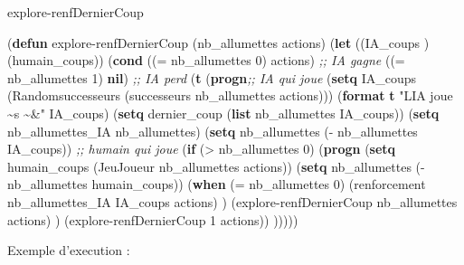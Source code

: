 \documentclass[
]{article}
\newenvironment{Shaded}{}{}
\newcommand{\CommentTok}[1]{\textcolor[rgb]{0.38,0.63,0.69}{\textit{#1}}}
\newcommand{\DecValTok}[1]{\textcolor[rgb]{0.25,0.63,0.44}{#1}}
\newcommand{\FunctionTok}[1]{\textcolor[rgb]{0.02,0.16,0.49}{#1}}
\newcommand{\KeywordTok}[1]{\textcolor[rgb]{0.00,0.44,0.13}{\textbf{#1}}}
\newcommand{\NormalTok}[1]{#1}
\newcommand{\OperatorTok}[1]{\textcolor[rgb]{0.40,0.40,0.40}{#1}}
\newcommand{\StringTok}[1]{\textcolor[rgb]{0.25,0.44,0.63}{#1}}
\begin{document}
\begin{Shaded}
\begin{algorithm}[H]
    \caption{explore-renfDernierCoup}
\begin{Highlighting}[]
\NormalTok{(}\KeywordTok{defun}\FunctionTok{ explore{-}renfDernierCoup }\NormalTok{(nb\_allumettes actions)}
\NormalTok{  (}\KeywordTok{let}\NormalTok{ ((IA\_coups ) (humain\_coups))}
\NormalTok{    (}\KeywordTok{cond} 
\NormalTok{     ((}\OperatorTok{=}\NormalTok{ nb\_allumettes }\DecValTok{0}\NormalTok{) actions) }\CommentTok{;; IA gagne}
\NormalTok{     ((}\OperatorTok{=}\NormalTok{ nb\_allumettes }\DecValTok{1}\NormalTok{) }\KeywordTok{nil}\NormalTok{) }\CommentTok{;; IA perd}
\NormalTok{     (}\KeywordTok{t} \NormalTok{(}\KeywordTok{progn}\CommentTok{;; IA qui joue}
\NormalTok{        (}\KeywordTok{setq}\NormalTok{ IA\_coups (Randomsuccesseurs (successeurs nb\_allumettes actions)))}
\NormalTok{        (}\KeywordTok{format} \KeywordTok{t} \StringTok{"L\textquotesingle{}IA joue \textasciitilde{}s \textasciitilde{}\&"}\NormalTok{ IA\_coups)}
\NormalTok{        (}\KeywordTok{setq}\NormalTok{ dernier\_coup (}\KeywordTok{list}\NormalTok{ nb\_allumettes IA\_coups))} 
\NormalTok{        (}\KeywordTok{setq}\NormalTok{ nb\_allumettes\_IA nb\_allumettes)}
\NormalTok{        (}\KeywordTok{setq}\NormalTok{ nb\_allumettes (}\OperatorTok{{-}}\NormalTok{ nb\_allumettes IA\_coups))}
        \CommentTok{;; humain qui joue}
\NormalTok{        (}\KeywordTok{if}\NormalTok{ (}\OperatorTok{\textgreater{}}\NormalTok{ nb\_allumettes }\DecValTok{0}\NormalTok{)}
\NormalTok{            (}\KeywordTok{progn}
\NormalTok{            (}\KeywordTok{setq}\NormalTok{ humain\_coups (JeuJoueur nb\_allumettes actions))}
\NormalTok{              (}\KeywordTok{setq}\NormalTok{ nb\_allumettes (}\OperatorTok{{-}}\NormalTok{ nb\_allumettes humain\_coups))}
\NormalTok{              (}\KeywordTok{when}\NormalTok{ (}\OperatorTok{=}\NormalTok{ nb\_allumettes }\DecValTok{0}\NormalTok{) }
\NormalTok{                  (renforcement nb\_allumettes\_IA IA\_coups actions)}
\NormalTok{              )}
\NormalTok{            (explore{-}renfDernierCoup nb\_allumettes actions)}
\NormalTok{            )}
\NormalTok{          (explore{-}renfDernierCoup }\DecValTok{1}\NormalTok{ actions))}
\NormalTok{        )))))}
\end{Highlighting}
\end{algorithm}
\end{Shaded}

Exemple d'execution :
\end{document}
